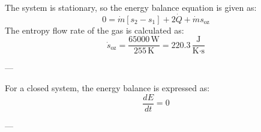 The system is stationary, so the energy balance equation is given as:  
\[
0 = \dot{m} \left[ s_2 - s_1 \right] + 2 \dot{Q} + \dot{m} s_{\text{oz}}
\]  
The entropy flow rate of the gas is calculated as:  
\[
\dot{s}_{\text{oz}} = \frac{65000 \, \text{W}}{255 \, \text{K}} = 220.3 \, \frac{\text{J}}{\text{K·s}}
\]  

---

For a closed system, the energy balance is expressed as:  
\[
\frac{dE}{dt} = 0
\]  

---